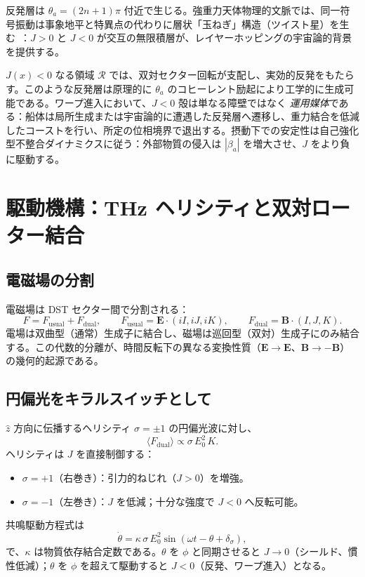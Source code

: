 \documentclass[dvipdfmx,a4paper]{article}
\theoremstyle{definition}
\begin{document}
反発層は $\theta_a=(2n+1)\pi$ 付近で生じる。強重力天体物理的文脈では、同一符号振動は事象地平と特異点の代わりに層状「玉ねぎ」構造（ツイスト星）を生む~\cite{dual2025}：$J>0$ と $J<0$ が交互の無限積層が、レイヤーホッピングの宇宙論的背景を提供する。

$J(x)<0$ なる領域 $\mathcal{R}$ では、双対セクター回転が支配し、実効的反発をもたらす。このような反発層は原理的に $\theta_a$ のコヒーレント励起により工学的に生成可能である。ワープ進入において、$J<0$ 殻は単なる障壁ではなく \emph{運用媒体}である：船体は局所生成または宇宙論的に遭遇した反発層へ遷移し、重力結合を低減したコーストを行い、所定の位相境界で退出する。摂動下での安定性は自己強化型不整合ダイナミクスに従う：外部物質の侵入は $|\beta_a|$ を増大させ、$J$ をより負に駆動する。

\section{駆動機構：THz ヘリシティと双対ローター結合}
\label{sec:drive}

\subsection{電磁場の分割}

電磁場は DST セクター間で分割される：
\begin{equation}
F = F_{\mathrm{usual}} + F_{\mathrm{dual}},
\qquad
F_{\mathrm{usual}} = \mathbf{E}\cdot(iI,iJ,iK),
\qquad
F_{\mathrm{dual}} = \mathbf{B}\cdot(I,J,K).
\label{eq:F-split}
\end{equation}
電場は双曲型（通常）生成子に結合し、磁場は巡回型（双対）生成子にのみ結合する。この代数的分離が、時間反転下の異なる変換性質（$\mathbf{E}\to\mathbf{E}$、$\mathbf{B}\to-\mathbf{B}$）の幾何的起源である。

\subsection{円偏光をキラルスイッチとして}

$\hat{z}$ 方向に伝播するヘリシティ $\sigma=\pm 1$ の円偏光波に対し、
\begin{equation}
\langle F_{\mathrm{dual}}\rangle \propto \sigma\,E_0^2\,K.
\label{eq:Fdual-avg}
\end{equation}
ヘリシティは $J$ を直接制御する：
\begin{itemize}[leftmargin=2em]
  \item $\sigma=+1$（右巻き）：引力的ねじれ（$J>0$）を増強。
  \item $\sigma=-1$（左巻き）：$J$ を低減；十分な強度で $J<0$ へ反転可能。
\end{itemize}
共鳴駆動方程式は
\begin{equation}
\dot{\theta} = \kappa\,\sigma\,E_0^2\sin(\omega t - \theta + \delta_\sigma),
\label{eq:theta-dot}
\end{equation}
で、$\kappa$ は物質依存結合定数である。$\theta$ を $\phi$ と同期させると $J\to 0$（シールド、慣性低減）；$\theta$ を $\phi$ を超えて駆動すると $J<0$（反発、ワープ進入）となる。
\end{document}
